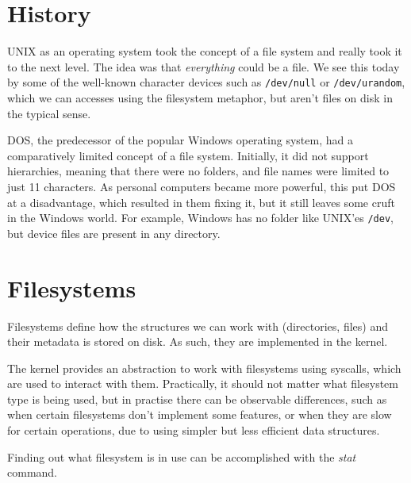 \documentclass[a4paper]{article}
\begin{document}

\section{History}

UNIX as an operating system took the concept of a file system and really took it to the next level. The idea was that \emph{everything} could be a file. We see this today by some of the well-known character devices such as \verb|/dev/null| or \verb|/dev/urandom|, which we can accesses using the filesystem metaphor, but aren't files on disk in the typical sense.

DOS, the predecessor of the popular Windows operating system, had a comparatively limited concept of a file system. Initially, it did not support hierarchies, meaning that there were no folders, and file names were limited to just 11 characters. As personal computers became more powerful, this put DOS at a disadvantage, which resulted in them fixing it, but it still leaves some cruft in the Windows world. For example, Windows has no folder like UNIX’es \verb|/dev|, but device files are present in any directory.

\section{Filesystems}

Filesystems define how the structures we can work with (directories, files) and their metadata is stored on disk. As such, they are implemented in the kernel. 

The kernel provides an abstraction to work with filesystems using syscalls, which are used to interact with them. Practically, it should not matter what filesystem type is being used, but in practise there can be observable differences, such as when certain filesystems don't implement some features, or when they are slow for certain operations, due to using simpler but less efficient data structures.



Finding out what filesystem is in use can be accomplished with the \emph{stat} command.
\end{document}
